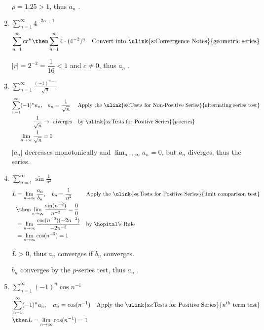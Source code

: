 \begin{enumerate}[itemsep=12em]
    \(\rho = 1.25 > 1 \), thus \(a_n\) .

  \vspace{-2em}
  \item \(\displaystyle \sum_{n=1}^{\infty} 4^{-2n+1}  \)
    \begin{align*}
      \sum_{n=1}^{\infty} cr^n
      \then \sum_{n=1}^{\infty} 4 \cdot (4^{-2})^n
      && \text{Convert into \ulink{s:Convergence Notes}{geometric series}}
    \end{align*}

  \(|r| = 2^{-2} = \dfrac{1}{16} < 1 \) and \(c\neq 0\), thus \(a_n\) .

  \item \(\displaystyle \sum_{n=1}^{\infty} \frac{(-1)^{n-1}}{\sqrt{n} }  \)
    \begin{align*}
    \sum_{n=1}^{\infty} (-1)^n a_n, &\quad a_n = \frac{1}{\sqrt{n}}
      && \text{Apply the \ulink{ss:Tests for Non-Positive Series}{alternating series test}} \\
      \frac{1}{\sqrt{n}} &\to ~\text{diverges}
      && \text{by \ulink{ss:Tests for Positive Series}{\(p\)-series}}\\
      \lim_{n \to \infty} \frac{1}{\sqrt{n}} &= 0
    \end{align*}
    \(|a_n|\) decreases monotonically and \(\lim_{n \to \infty} a_n = 0\), but
    \(a_n\) diverges, thus the series.

  \vspace{-96pt}
  \item \(\displaystyle \sum_{n=1}^{\infty} \sin \frac{1}{n^2}  \)
    \begin{align*}
     L &= \lim_{n \to \infty} \frac{a_n}{b_n}, \quad b_n = \frac{1}{n^2}
       && \text{Apply the \ulink{ss:Tests for Positive Series}{limit comparison test}} \\
       &\then \lim_{n \to \infty} \frac{\sin(n^{-2})}{n^{-2}} =  \frac{0}{0} \\
       &= \lim_{n \to \infty} \frac{\cos (n^{-2})(-2n^{-3})}{-2n^{-3}}
       && \text{by \hopital's Rule} \\
       &= \lim_{n \to \infty} \cos (n^{-2}) = 1
    \end{align*}

    \(L > 0\), thus \(a_n\) converges if \(b_n\) converges.

    \(b_n\) converges by the \(p\)-series test, thus \(a_n\) .

  \vspace{-80pt}
  \item \(\displaystyle \sum_{n=1}^{\infty} (-1)^n \cos n^{-1} \)
    \begin{align*}
      &\sum_{n=1}^{\infty} (-1)^n a_n, \quad a_n = \cos (n^{-1})
      && \text{Apply the \ulink{ss:Tests for Positive Series}{\(n^{th}\) term test}} \\
      &\then L = \lim_{n \to \infty} \cos (n^{-1}) = 1
    \end{align*}


\end{enumerate}
